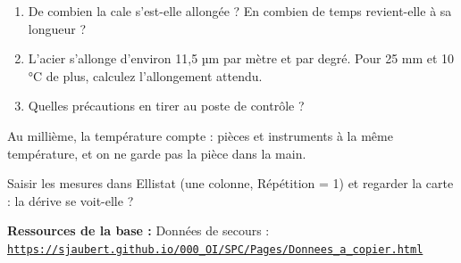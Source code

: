 \documentclass[10pt,a4paper]{article}
\begin{document}
\newpage
{}
\begin{enumerate}[label=\textcolor{cyan}{\textbf{Q\arabic*.}},leftmargin=22pt]
\item De combien la cale s'est-elle allongée ? En combien de temps revient-elle à sa longueur ?\reponse[2]
\item L'acier s'allonge d'environ 11,5 µm par mètre et par degré. Pour 25 mm et 10 °C de plus, calculez l'allongement attendu.\reponse[2]
\item Quelles précautions en tirer au poste de contrôle ?\reponse[2]
\end{enumerate}
\begin{tcolorbox}[retenir]Au millième, la température compte : pièces et instruments à la même température, et on ne garde pas la pièce dans la main.\end{tcolorbox}
\begin{tcolorbox}[plus]Saisir les mesures dans Ellistat (une colonne, Répétition = 1) et regarder la carte : la dérive se voit-elle ?\end{tcolorbox}
\vfill{\footnotesize\color{uimm}\textbf{Ressources de la base :} Données de secours : \href{https://sjaubert.github.io/000_OI/SPC/Pages/Donnees_a_copier.html\#chauffe}{\nolinkurl{https://sjaubert.github.io/000_OI/SPC/Pages/Donnees_a_copier.html}}}
\end{document}

